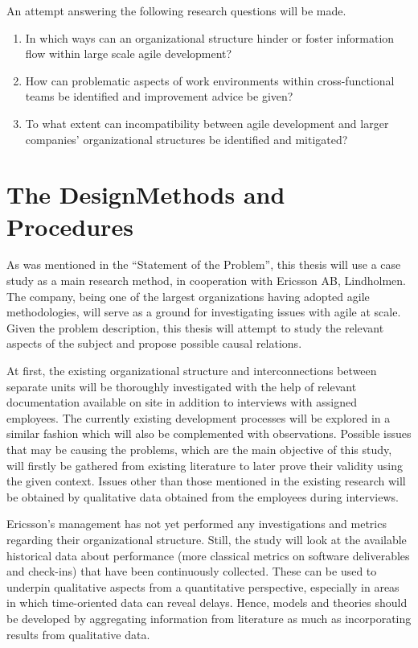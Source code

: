 \documentclass[paper=a4, fontsize=11pt]{scrartcl}
\numberwithin{equation}{section}		%
\numberwithin{figure}{section}			%
\numberwithin{table}{section}			%
\newcommand{\quotes}[1]{``#1''}
\begin{document}
An attempt answering the following research questions will be made.

\begin{enumerate}
   \item In which ways can an organizational structure hinder or foster information flow within large scale agile development?
   \item How can problematic aspects of work environments within cross-functional teams be identified and improvement advice be given?
   \item To what extent can incompatibility between agile development and larger companies' organizational structures be identified and mitigated?
\end{enumerate}

\section{The Design\textemdash Methods and Procedures}

As was mentioned in the \quotes{Statement of the Problem}, this thesis will use a case study as a main research method, in cooperation with Ericsson AB, Lindholmen. The company, being one of the largest organizations having adopted agile methodologies, will serve as a ground for investigating issues with agile at scale. Given the problem description, this thesis will attempt to study the relevant aspects of the subject and propose possible causal relations.

At first, the existing organizational structure and interconnections between separate units will be thoroughly investigated with the help of relevant documentation available on site in addition to interviews with assigned employees. The currently existing development processes will be explored in a similar fashion which will also be complemented with observations.
Possible issues that may be causing the problems, which are the main objective of this study, will firstly be gathered from existing literature to later prove their validity using the given context. Issues other than those mentioned in the existing research will be obtained by qualitative data obtained from the employees during interviews.

Ericsson's management has not yet performed any investigations and metrics regarding their organizational structure. Still, the study will look at the available historical data about performance (more classical metrics on software deliverables and check-ins) that have been continuously collected. These can be used to underpin qualitative aspects from a quantitative perspective, especially in areas in which time-oriented data can reveal delays. Hence, models and theories should be developed by aggregating information from literature as much as incorporating results from qualitative data.
\end{document}
